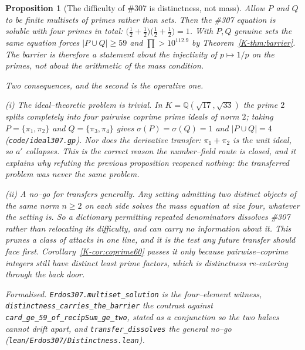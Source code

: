 \documentclass[11pt]{article}
\newtheorem{proposition}[theorem]{Proposition}
\theoremstyle{definition}
\begin{document}
\begin{proposition}[The difficulty of \#307 is distinctness, not mass]\label{prop:distinct}
Allow $P$ and $Q$ to be finite \emph{multisets} of primes rather than sets. Then the \#307 equation
is soluble with four primes in total:
$\bigl(\tfrac12+\tfrac12\bigr)\bigl(\tfrac12+\tfrac12\bigr)=1$. With $P,Q$ genuine sets the same
equation forces $|P\cup Q|\ge59$ and $\prod>10^{112.9}$ by Theorem~\ref{K-thm:barrier}. The barrier is
therefore a statement about the injectivity of $p\mapsto1/p$ on the primes, not about the arithmetic
of the mass condition.

Two consequences, and the second is the operative one.

\textup{(i)} \emph{The ideal--theoretic problem is trivial.} In $K=\mathbb{Q}(\sqrt{17},\sqrt{33})$
the prime $2$ splits completely into four pairwise coprime prime ideals of norm $2$; taking
$P=\{\pi_1,\pi_2\}$ and $Q=\{\pi_3,\pi_4\}$ gives $\sigma(P)=\sigma(Q)=1$ and $|P\cup Q|=4$
\textup{(\texttt{code/ideal307.gp})}. Nor does the derivative transfer: $\pi_1+\pi_2$ is the unit
ideal, so $a'$ collapses. This is the correct reason the number--field route is closed, and it
explains why refuting the previous proposition reopened nothing: the transferred problem was never
the same problem.

\textup{(ii)} \emph{A no--go for transfers generally.} Any setting admitting two distinct objects of
the same norm $n\ge2$ on each side solves the mass equation at size four, whatever the setting is.
So a dictionary permitting repeated denominators \emph{dissolves} \#307 rather than relocating its
difficulty, and can carry no information about it. This prunes a class of attacks in one line, and
it is the test any future transfer should face first. Corollary~\ref{K-cor:coprime60} passes it only
because pairwise--coprime integers still have distinct least prime factors, which is distinctness
re-entering through the back door.

\textup{Formalised.} \texttt{Erdos307.multiset\_solution} is the four--element witness,
\texttt{distinctness\_carries\_the\_barrier} the contrast against
\texttt{card\_ge\_59\_of\_recipSum\_ge\_two}, stated as a conjunction so the two halves cannot drift
apart, and \texttt{transfer\_dissolves} the general no--go
\textup{(\texttt{lean/Erdos307/Distinctness.lean})}.
\end{proposition}
\end{document}
